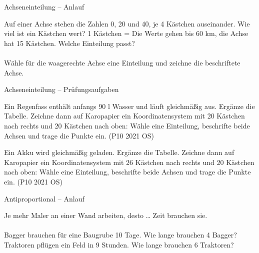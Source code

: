 \begin{aufgabe}{Achseneinteilung – Anlauf}
\begin{teile}
\teil Auf einer Achse stehen die Zahlen 0, 20 und 40, je 4 Kästchen auseinander. Wie viel ist ein Kästchen wert? 1 Kästchen = \leerfeld
\teil Die Werte gehen bis 60 km, die Achse hat 15 Kästchen. Welche Einteilung passt? \\  \\ 
\teil Wähle für die waagerechte Achse eine Einteilung und zeichne die beschriftete Achse.

\end{teile}
\end{aufgabe}

\begin{aufgabe}{Achseneinteilung – Prüfungsaufgaben}
\begin{teile}
\teil Ein Regenfass enthält anfangs 90 l Wasser und läuft gleichmäßig aus. Ergänze die Tabelle. Zeichne dann auf Karopapier ein Koordinatensystem mit 20 Kästchen nach rechts und 20 Kästchen nach oben: Wähle eine Einteilung, beschrifte beide Achsen und trage die Punkte ein. \hfill (P10 2021 OS)

\teil Ein Akku wird gleichmäßig geladen. Ergänze die Tabelle. Zeichne dann auf Karopapier ein Koordinatensystem mit 26 Kästchen nach rechts und 20 Kästchen nach oben: Wähle eine Einteilung, beschrifte beide Achsen und trage die Punkte ein. \hfill (P10 2021 OS)

\end{teile}
\end{aufgabe}

\begin{aufgabe}{Antiproportional – Anlauf}
\begin{teile}
\teil Je mehr Maler an einer Wand arbeiten, desto … Zeit brauchen sie. \\  \\ 
 Bagger brauchen für eine Baugrube 10 Tage. Wie lange brauchen 4 Bagger? \leerfeld[Tage]
 Traktoren pflügen ein Feld in 9 Stunden. Wie lange brauchen 6 Traktoren? \leerfeld[h]
\end{teile}
\end{aufgabe}

